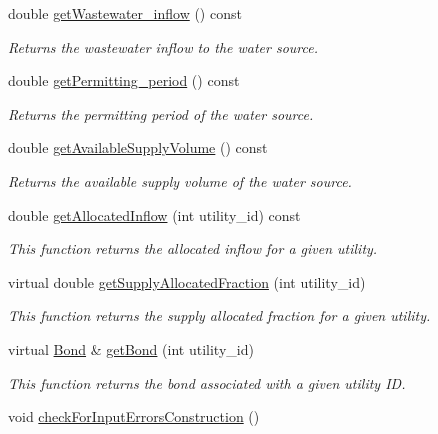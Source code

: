 \begin{DoxyCompactItemize}
double \mbox{\hyperlink{classWaterSource_aee22325e6af0e3c804ddbd9a3505be05}{get\+Wastewater\+\_\+inflow}} () const
\begin{DoxyCompactList}\small\item\em Returns the wastewater inflow to the water source. \end{DoxyCompactList}\item 
double \mbox{\hyperlink{classWaterSource_aa21d3f1c87ced40c2b673d9e43d99176}{get\+Permitting\+\_\+period}} () const
\begin{DoxyCompactList}\small\item\em Returns the permitting period of the water source. \end{DoxyCompactList}\item 
double \mbox{\hyperlink{classWaterSource_af6445a2dd3764907bcb9a37d4647f910}{get\+Available\+Supply\+Volume}} () const
\begin{DoxyCompactList}\small\item\em Returns the available supply volume of the water source. \end{DoxyCompactList}\item 
double \mbox{\hyperlink{classWaterSource_a63b1a410b47710db049e2b2e9c3c39a0}{get\+Allocated\+Inflow}} (int utility\+\_\+id) const
\begin{DoxyCompactList}\small\item\em This function returns the allocated inflow for a given utility. \end{DoxyCompactList}\item 
virtual double \mbox{\hyperlink{classWaterSource_a484bca192a9e3aacaad47db0afb8fbdd}{get\+Supply\+Allocated\+Fraction}} (int utility\+\_\+id)
\begin{DoxyCompactList}\small\item\em This function returns the supply allocated fraction for a given utility. \end{DoxyCompactList}\item 
virtual \mbox{\hyperlink{classBond}{Bond}} \& \mbox{\hyperlink{classWaterSource_acacef71453819480c5438ae5b433e66b}{get\+Bond}} (int utility\+\_\+id)
\begin{DoxyCompactList}\small\item\em This function returns the bond associated with a given utility ID. \end{DoxyCompactList}\item 
void \mbox{\hyperlink{classWaterSource_a47bc2006a1ef6ea4429d56a24319940f}{check\+For\+Input\+Errors\+Construction}} ()

\end{DoxyCompactItemize}
